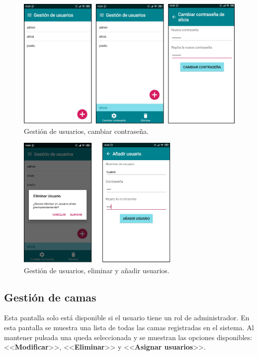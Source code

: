 \begin{figure}[H]
	\centering
	\includegraphics[width=1\textwidth]{../img/gestiondeusuarios.png}
	\caption{Gestión de usuarios, cambiar contraseña.}
	\label{fig:gestiondeusuarios}
\end{figure}

\begin{figure}[H]
	\centering
	\includegraphics[width=0.7\textwidth]{../img/eliminaranadir.png}
	\caption{Gestión de usuarios, eliminar y añadir usuarios.}
	\label{fig:eliminaranadir}
\end{figure}

\subsection{Gestión de camas}

Esta pantalla solo está disponible si el usuario tiene un rol de administrador. En esta pantalla se muestra una lista de todas las camas registradas en el sistema. Al mantener pulsada una queda seleccionada y se muestran las opciones disponibles: <<\textbf{Modificar}>>, <<\textbf{Eliminar}>> y <<\textbf{Asignar usuarios}>>.  

